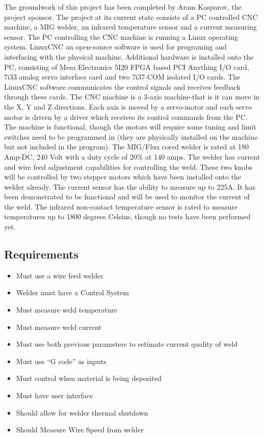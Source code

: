 \documentclass[12pt]{article}
\newlength\tindent
\renewcommand{\indent}{\hspace*{\tindent}}
\begin{document}
\indent The groundwork of this project has been completed by Aram Kasparov, the project sponsor. The project at its current state consists of a PC controlled CNC machine, a MIG welder, an infrared temperature sensor and a current measuring sensor. The PC controlling the CNC machine is running a Linux operating system. LinuxCNC an open-source software is used for programing and interfacing with the physical machine. Additional hardware is installed onto the PC, consisting of Mesa Electronics 5I20 FPGA based PCI Anything I/O card, 7i33 analog servo interface card and two 7i37-COM isolated I/O cards. The LinuxCNC software communicates the control signals and receives feedback through these cards. The CNC machine is a 3-axis machine-that is it can move in the X, Y and Z directions. Each axis is moved by a servo-motor and each servo motor is driven by a driver which receives its control commands from the PC. The machine is functional, though the motors will require some tuning and limit switches need to be programmed in (they are physically installed on the machine but not included in the program). The MIG/Flux cored welder is rated at 180 Amp-DC, 240 Volt with a duty cycle of 20\% at 140 amps. The welder has current and wire feed adjustment capabilities for controlling the weld. These two knobs will be controlled by two stepper motors which have been installed onto the welder already. The current sensor has the ability to measure up to 225A. It has been demonstrated to be functional and will be used to monitor the current of the weld. The infrared non-contact temperature sensor is rated to measure temperatures up to 1800 degrees Celsius, though no tests have been performed yet.

\clearpage

\subsection{Requirements}

\begin{itemize}
\item Must use a wire feed welder
\item Welder must have a Control System
\item Must measure weld temperature
\item Must measure weld current
\item Must use both previous parameters to estimate current quality of weld
\item Must use “G code” as inputs
\item Must control when material is being deposited
\item Must have user interface
\item Should allow for welder thermal shutdown
\item Should Measure Wire Speed from welder
\end{itemize}
\end{document}
